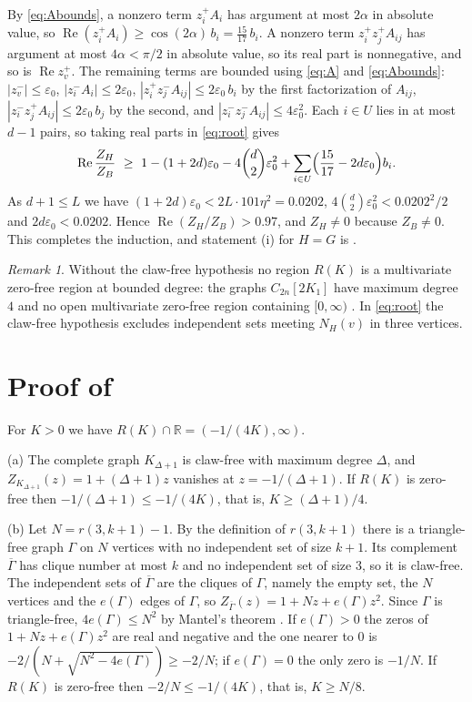\documentclass[11pt]{article}
\theoremstyle{remark}
\newtheorem{remark}[theorem]{Remark}
\renewcommand{\Re}{\operatorname{Re}}
\begin{document}
By \eqref{eq:Abounds}, a nonzero term $z_i^+A_i$ has argument at most $2\alpha$ in absolute value, so
$\Re(z_i^+A_i)\ge\cos(2\alpha)\,b_i=\tfrac{15}{17}\,b_i$. A nonzero term $z_i^+z_j^+A_{ij}$ has argument at most
$4\alpha<\pi/2$ in absolute value, so its real part is nonnegative, and so is $\Re z_v^+$. The remaining terms are
bounded using \eqref{eq:A} and \eqref{eq:Abounds}: $|z_v^-|\le\varepsilon_0$, $|z_i^-A_i|\le2\varepsilon_0$,
$|z_i^+z_j^-A_{ij}|\le2\varepsilon_0\,b_i$ by the first factorization of $A_{ij}$, $|z_i^-z_j^+A_{ij}|\le2\varepsilon_0\,b_j$
by the second, and $|z_i^-z_j^-A_{ij}|\le4\varepsilon_0^2$. Each $i\in U$ lies in at most $d-1$ pairs, so taking real
parts in \eqref{eq:root} gives
\[
\Re\frac{Z_H}{Z_B}\ \ge\ 1-(1+2d)\varepsilon_0-4\binom d2\varepsilon_0^2+\sum_{i\in U}\Bigl(\frac{15}{17}-2d\varepsilon_0\Bigr)b_i .
\]
As $d+1\le L$ we have $(1+2d)\varepsilon_0<2L\cdot101\eta^2=0.0202$, $4\binom d2\varepsilon_0^2<0.0202^2/2$ and
$2d\varepsilon_0<0.0202$. Hence $\Re(Z_H/Z_B)>0.97$, and $Z_H\ne0$ because $Z_B\ne0$. This completes the induction,
and statement (i) for $H=G$ is .

\begin{remark}
Without the claw-free hypothesis no region $R(K)$ is a multivariate zero-free region at bounded degree: the graphs
$C_{2n}[2K_1]$ have maximum degree $4$ and no open multivariate zero-free region containing $[0,\infty)$
\cite[Lemma~15]{JP}. In \eqref{eq:root} the claw-free hypothesis excludes independent sets meeting $N_H(v)$ in three vertices.
\end{remark}

\section{Proof of \texorpdfstring{}{Proposition 1.2}}\label{sec:lower}

For $K>0$ we have $R(K)\cap\mathbb R=(-1/(4K),\infty)$.

(a) The complete graph $K_{\Delta+1}$ is claw-free with maximum degree $\Delta$, and
$Z_{K_{\Delta+1}}(z)=1+(\Delta+1)z$ vanishes at $z=-1/(\Delta+1)$. If $R(K)$ is zero-free then
$-1/(\Delta+1)\le-1/(4K)$, that is, $K\ge(\Delta+1)/4$.

(b) Let $N=r(3,k+1)-1$. By the definition of $r(3,k+1)$ there is a triangle-free graph $\Gamma$ on $N$ vertices with no
independent set of size $k+1$. Its complement $\overline \Gamma$ has clique number at most $k$ and no independent set of
size $3$, so it is claw-free. The independent sets of $\overline \Gamma$ are the cliques of $\Gamma$, namely the empty set, the
$N$ vertices and the $e(\Gamma)$ edges of $\Gamma$, so $Z_{\overline \Gamma}(z)=1+Nz+e(\Gamma)z^2$. Since $\Gamma$ is triangle-free,
$4e(\Gamma)\le N^2$ by Mantel's theorem \cite{Mantel}. If $e(\Gamma)>0$ the zeros of $1+Nz+e(\Gamma)z^2$ are real and negative and the one nearer to $0$ is
$-2/(N+\sqrt{N^2-4e(\Gamma)})\ge-2/N$; if $e(\Gamma)=0$ the only zero is $-1/N$. If $R(K)$ is zero-free then $-2/N\le-1/(4K)$,
that is, $K\ge N/8$.
\end{document}
